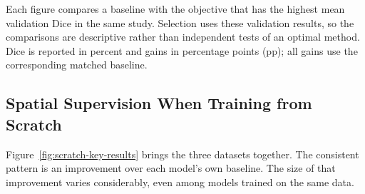 \documentclass[12pt,a4paper]{article}
\begin{document}
Each figure compares a baseline with the objective that has the highest
mean validation Dice in the same study. Selection uses these validation
results, so the comparisons are descriptive rather than independent tests
of an optimal method. Dice is reported in percent and gains in percentage
points (pp); all gains use the corresponding matched baseline.

\subsection{Spatial Supervision When Training from Scratch}
\label{sec:geo-results}\label{sec:main-msd-results}\label{sec:adni-results}

Figure~\ref{fig:scratch-key-results} brings the three datasets together.
The consistent pattern is an improvement over each model's own baseline.
The size of that improvement varies considerably, even among models
trained on the same data.
\end{document}
